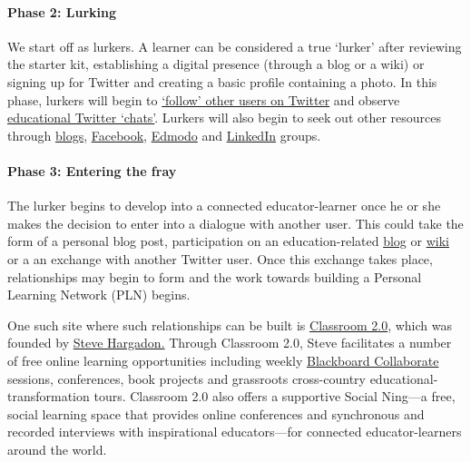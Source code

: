 \paragraph{Phase 2: Lurking}

We start off as lurkers. A learner can be considered a true `lurker'
after reviewing the starter kit, establishing a digital presence
(through a blog or a wiki) or signing up for Twitter and creating a
basic profile containing a photo. In this phase, lurkers will begin to
\href{http://www.google.com/url?q=http\%3A\%2F\%2Fwww.fractuslearning.com\%2F2012\%2F05\%2F25\%2Ftwitter-follow-education-technology\%2F\&sa=D\&sntz=1\&usg=AFQjCNF8grPMuRwU\_ImW9Jk3ZYrg0m9KgQ}{`follow'
other users on Twitter} and observe
\href{http://www.google.com/url?q=http\%3A\%2F\%2Fcybraryman.com\%2Fchats.html\&sa=D\&sntz=1\&usg=AFQjCNFJASZiwfvPbfOzFbHvAunpXfNC1g}{educational
Twitter `chats'}. Lurkers will also begin to seek out other resources
through
\href{http://theinnovativeeducator.blogspot.ca/2012/04/ten-best-education-blogs.html}{blogs},
\href{http://www.google.com/url?q=http\%3A\%2F\%2Fwww.edsocialmedia.com\%2F2011\%2F02\%2Fthe-advantage-of-facebook-groups-in-education\%2F\&sa=D\&sntz=1\&usg=AFQjCNEvc43Q7GqJqS-2S8GhEJ53Ye-j4Q}{Facebook},
\href{http://www.slideshare.net/cmsdsquires/edmodo-for-teachers-guide}{Edmodo}
and
\href{http://www.emergingedtech.com/2012/02/8-great-linkedin-groups-for-educators/}{LinkedIn}
groups.

\paragraph{Phase 3: Entering the fray}

The lurker begins to develop into a connected educator-learner once he
or she makes the decision to enter into a dialogue with another user.
This could take the form of a personal blog post, participation on an
education-related
\href{http://edudemic.com/2012/08/education-blogs/?utm\_medium=twitter\&utm\_source=twitterfeed}{blog}
or
\href{http://educationalwikis.wikispaces.com/Examples+of+educational+wikis}{wiki}
or a an exchange with another Twitter user. Once this exchange takes
place, relationships may begin to form and the work towards building a
Personal Learning Network (PLN) begins.

One such site where such relationships can be built is
\href{http://www.classroom20.com/}{Classroom 2.0}, which was founded by
\href{http://www.stevehargadon.com/}{Steve Hargadon.} Through Classroom
2.0, Steve facilitates a number of free online learning opportunities
including weekly
\href{http://www.google.com/url?q=http\%3A\%2F\%2Fwww.futureofeducation.com\%2Fnotes\%2FPast\_Interviews\&sa=D\&sntz=1\&usg=AFQjCNHVYOvP-w7NTgKp2Fu2AX4YycnPQQ}{Blackboard
Collaborate} sessions, conferences, book projects and grassroots
cross-country educational-transformation tours. Classroom 2.0 also
offers a supportive Social Ning---a free, social learning space that
provides online conferences and synchronous and recorded interviews with
inspirational educators---for connected educator-learners around the
world.

